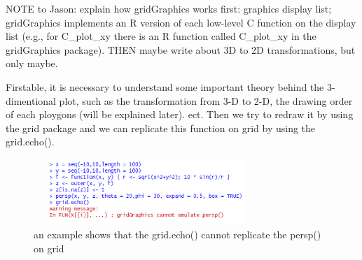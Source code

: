 \documentclass[a4paper,10pt]{article}
\begin{document}
NOTE to Jason: explain how gridGraphics works first: graphics display list; gridGraphics implements an R version of each low-level C function on the display list (e.g., for C\_plot\_xy there is an R function called C\_plot\_xy in the gridGraphics package). THEN maybe write about 3D to 2D transformations, but only maybe.

Firstable, it is necessary to understand some important theory behind the 3-dimentional plot, such as the transformation from 3-D to 2-D, the drawing order of each ploygons (will be explained later). ect. Then we try to redraw it by using the grid package and we can replicate this function on grid by using the grid.echo().


\begin{figure}[h]
  \includegraphics[height = 2.5cm, width = 8.5cm]{figure/warning.png}
  \caption{an example shows that the grid.echo() cannot replicate the persp() on grid}
  	\label{figure2}
\end{figure}
\end{document}

